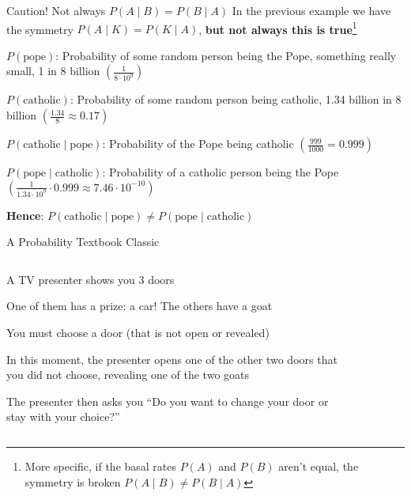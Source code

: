 \begin{frame}{Caution! Not always $P(A \mid B) = P(B \mid A)$}
	In the previous example we have the symmetry $P(A \mid K) = P(K \mid A)$,
	\textbf{but not always this is true}\footnote{
		More specific, if the basal rates $P(A)$ and $P(B)$ aren't equal,
		the symmetry is broken $P(A \mid B) \neq P(B \mid A)$}
	\begin{example}
		\begin{vfilleditems}
			\small{
				\item $P(\text{pope})$:
				Probability of some random person being the Pope,
				something really small, 1 in 8 billion $\left( \frac{1}{8 \cdot 10^9} \right)$
				\item $P(\text{catholic})$:
				Probability of some random person being catholic,
				1.34 billion in 8 billion $\left( \frac{1.34}{8} \approx 0.17 \right)$
				\item $P(\text{catholic} \mid \text{pope})$:
				Probability of the Pope being catholic $\left( \frac{999}{1000} = 0.999 \right)$
				\item $P(\text{pope} \mid \text{catholic})$:
				Probability of a catholic person being the Pope $\left( \frac{1}{1.34 \cdot 10^9} \cdot 0.999 \approx 7.46 \cdot 10^{-10} \right)$
			}
			\item \large{\textbf{Hence}: $P(\text{catholic} \mid \text{pope}) \neq P(\text{pope} \mid \text{catholic})$}
		\end{vfilleditems}
	\end{example}
\end{frame}

\begin{frame}{A Probability Textbook Classic}
	\begin{columns}
		\begin{column}{0.6\textwidth}
			\begin{example}
				\begin{vfilleditems}
					\small
					\item A TV presenter shows you 3 doors
					\item One of them has a prize: a car!
					The others have a goat
					\item You must choose a door (that is not open or revealed)
					\item In this moment, the presenter opens one of the other two doors
					that you did not choose,
					revealing one of the two goats
					\item The presenter then asks you
					``Do you want to change your door or stay with your choice?''
				\end{vfilleditems}
			\end{example}
		\end{column}
		\begin{column}{0.4\textwidth}
			\begin{figure}
				\centering
				\def\svgwidth{\columnwidth}
				
			\end{figure}
		\end{column}
	\end{columns}
\end{frame}


